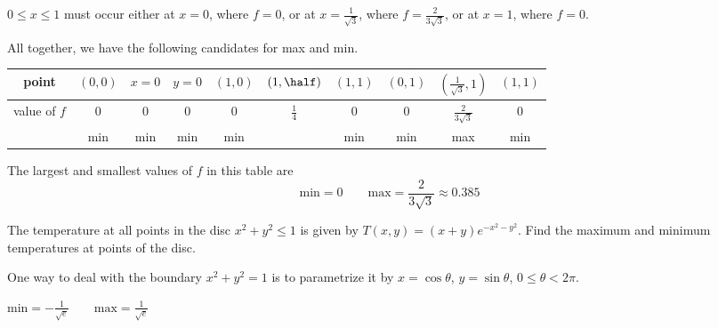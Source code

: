 \begin{solution}
\begin{itemize}
$0\le x\le 1$ must occur either at $x=0$, where $f=0$, or 
at $x=\frac{1}{\sqrt{3}}$, where $f=\frac{2}{3\sqrt{3}}$, 
or at $x=1$, where $f=0$.
\end{itemize}
All together, we have the following candidates for max and min.
\begin{center}
\renewcommand{\arraystretch}{1.3}
     \begin{tabular}{|c|c|c|c|c|c|c|c|c|c|}
     \hline
       point
       &$(0,0)$
       &$x=0$                    %
       &$y=0$                    %
       &$(1,0)$
       &$(1,\half)$
       &$(1,1)$
       &$(0,1)$
       &$(\frac{1}{\sqrt{3}},1)$
       &$(1,1)$ \\ \hline
       value of $f$
       &$0$
       &$0$
       &$0$
       &$0$
       &$\frac{1}{4}$
       &$0$
       &$0$
       &$\frac{2}{3\sqrt{3}}$
       &$0$ \\ \hline
       &min 
       &min    
       &min  
       &min  
       &  
       &min 
       &min
       &max
       &min \\ \hline
     \end{tabular}
\renewcommand{\arraystretch}{1.0}
\end{center}
The largest and smallest values of $f$ in this table are
\begin{equation*}
\text{min}=0\qquad
\text{max}=\frac{2}{3\sqrt{3}}\approx0.385
\end{equation*}
\end{solution}

\begin{question}
The temperature at all points in the disc $x^2+y^2\le 1$ is given by
$T(x,y)=(x+y)e^{-x^2-y^2}$. Find the maximum and minimum temperatures
at points of the disc.
\end{question}

\begin{hint}
One way to deal with the boundary $x^2+y^2=1$ is to parametrize
it by $x=\cos\theta$, $y=\sin\theta$, $0\le\theta<2\pi$.
\end{hint}

\begin{answer}
$
\text{min}=-\frac{1}{\sqrt{e}}\qquad
\text{max}=\frac{1}{\sqrt{e}}
$
\end{answer}

